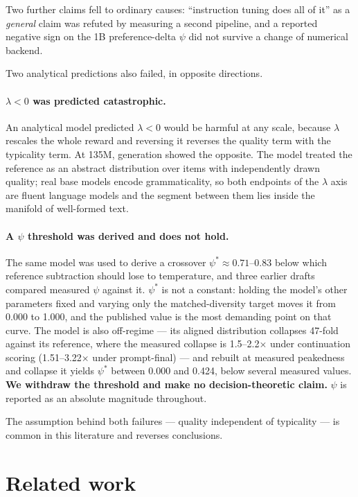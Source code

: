 \documentclass[11pt]{article}
\begin{document}
Two further claims fell to ordinary causes: ``instruction tuning does all of it'' as
a \emph{general} claim was refuted by measuring a second pipeline, and a reported
negative sign on the 1B preference-delta $\psi$ did not survive a change of
numerical backend.

Two analytical predictions also failed, in opposite directions.

\paragraph{$\lambda < 0$ was predicted catastrophic.} An analytical model predicted
$\lambda < 0$ would be harmful at any scale, because $\lambda$ rescales the whole
reward and reversing it reverses the quality term with the typicality term. At 135M,
generation showed the opposite. The model treated the reference as an abstract
distribution over items with independently drawn quality; real base models encode
grammaticality, so both endpoints of the $\lambda$ axis are fluent language models
and the segment between them lies inside the manifold of well-formed text.

\paragraph{A $\psi$ threshold was derived and does not hold.} The same model was
used to derive a crossover $\psi^{*} \approx 0.71$--$0.83$ below which reference
subtraction should lose to temperature, and three earlier drafts compared measured
$\psi$ against it. $\psi^{*}$ is not a constant: holding the model's other
parameters fixed and varying only the matched-diversity target moves it from 0.000
to 1.000, and the published value is the most demanding point on that curve. The
model is also off-regime --- its aligned distribution collapses 47-fold against its
reference, where the measured collapse is 1.5--2.2$\times$ under continuation
scoring (1.51--3.22$\times$ under prompt-final) --- and rebuilt at measured
peakedness and collapse it yields $\psi^{*}$ between 0.000 and 0.424, below several
measured values. \textbf{We withdraw the threshold and make no decision-theoretic
claim.} $\psi$ is reported as an absolute magnitude throughout.

The assumption behind both failures --- quality independent of typicality --- is
common in this literature and reverses conclusions.

\section{Related work}
\end{document}
